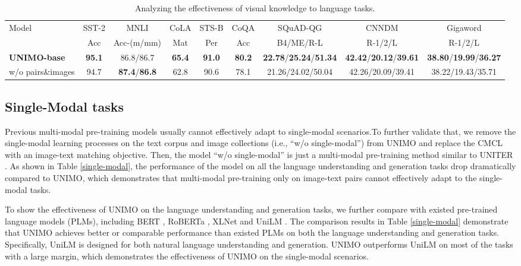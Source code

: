 \documentclass[11pt,a4paper]{article}
\begin{document}
\begin{table*}[ht!]
 \centering
 \setlength{\tabcolsep}{2.7pt}
 \small
 \begin{tabular}{l c c c c c c c c}
  \hline \hline
  \multirow{2}{*}{Model} & SST-2 & MNLI & CoLA & STS-B & CoQA & SQuAD-QG & CNNDM & Gigaword\\
  & Acc & Acc-(m/mm)& Mat & Per & Acc & B4/ME/R-L & R-1/2/L & R-1/2/L \\
  \hline
  \hline
  \textbf{UNIMO-base} & \textbf{95.1}& 86.8/86.7 & \textbf{65.4} & \textbf{91.0} & \textbf{80.2} & \textbf{22.78}/\textbf{25.24}/\textbf{51.34} & \textbf{42.42}/\textbf{20.12}/\textbf{39.61} & \textbf{38.80}/\textbf{19.99}/\textbf{36.27} \\
  w/o pairs\&images & 94.7 & \textbf{87.4}/\textbf{86.8} & 62.8 & 90.6 & 78.1 & 21.26/24.02/50.04 & 42.26/20.09/39.41 & 38.22/19.43/35.71   \\
  \hline
 \end{tabular}
 \caption{\label{vision-text}
Analyzing the effectiveness of visual knowledge to language tasks.
}
\end{table*}









\subsection{Single-Modal tasks}
\label{ssec:sin}

Previous multi-modal pre-training models usually cannot effectively adapt to single-modal scenarios.To further validate that, we remove the single-modal learning processes on the text corpus and image collections (i.e., ``w/o single-modal'') from UNIMO and replace the CMCL with an image-text matching objective. 
Then, the model ``w/o single-modal'' is just a multi-modal pre-training method similar to UNITER \citep{chen2020uniter}.
As shown in Table \ref{single-modal}, the performance of the model on all the language understanding and generation tasks drop dramatically compared to UNIMO, which demonstrates that multi-modal pre-training only on image-text pairs cannot effectively adapt to the single-modal tasks.


To show the effectiveness of UNIMO on the language understanding and generation tasks, we further compare with existed pre-trained language models (PLMs), including BERT \citep{devlin-etal-2019-bert}, RoBERTa \citep{liu2019roberta}, XLNet \citep{yang2019xlnet} and UniLM \citep{dong2019unified}. 
The comparison results in Table \ref{single-modal} demonstrate that UNIMO achieves better or comparable performance than existed PLMs on both the language understanding and generation tasks.
Specifically, UniLM \citep{dong2019unified} is designed for both natural language understanding and generation.
UNIMO outperforms UniLM on most of the tasks with a large margin, which demonstrates the effectiveness of UNIMO on the single-modal scenarios.
\end{document}
